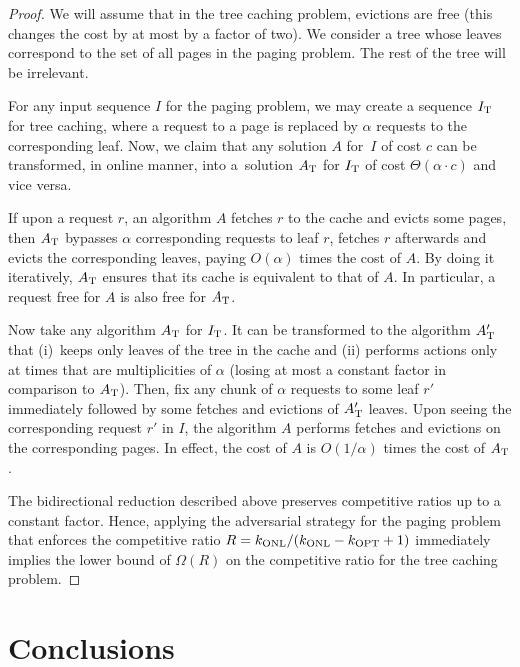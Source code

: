 \begin{proof}
We will assume that in the tree caching problem, evictions are free (this
changes the cost by at most by a factor of two). We consider a tree whose
leaves correspond to the set of all pages in the paging problem. The rest of
the tree will be irrelevant.

For any input sequence $I$ for the paging problem, we may create a sequence
$I_\textnormal{T}$ for tree caching, where a request to a page is replaced by
$\alpha$ requests to the corresponding leaf. Now, we claim that any solution
$A$ for~$I$ of cost $c$ can be transformed, in online manner, into a~solution
$A_\textnormal{T}$ for $I_\textnormal{T}$ of cost $\Theta(\alpha \cdot c)$ and
vice versa.

If upon a request $r$, an algorithm $A$ fetches $r$ to the cache and evicts
some pages, then $A_\textnormal{T}$ bypasses $\alpha$ corresponding requests
to leaf $r$, fetches $r$ afterwards and evicts the corresponding leaves,
paying $O(\alpha)$ times the cost of $A$. By doing it iteratively,
$A_\textnormal{T}$ ensures that its cache is equivalent to that of $A$. In
particular, a request free for $A$ is also free for $A_\textnormal{T}$.

Now take any algorithm $A_\textnormal{T}$ for $I_\textnormal{T}$. It can be
transformed to the algorithm $A_\textnormal{T}'$ that (i)~keeps only leaves of
the tree in the cache and (ii) performs actions only at times that are
multiplicities of $\alpha$ (losing at most a constant factor in comparison to
$A_\textnormal{T}$). Then, fix any chunk of $\alpha$ requests to some leaf
$r'$ immediately followed by some fetches and evictions of $A_\textnormal{T}'$
leaves. Upon seeing the corresponding request $r'$ in $I$, the algorithm $A$
performs fetches and evictions on the corresponding pages. In effect, the cost
of $A$ is $O(1/\alpha)$ times the cost of $A_\textnormal{T}$.

The bidirectional reduction described above preserves competitive ratios up to
a constant factor. Hence, applying the adversarial strategy for the paging
problem that enforces the competitive ratio  $R = k_\textnormal{ONL}/(k_\textnormal{ONL}-k_\textnormal{OPT}+1)$
\cite{competitive-analysis} immediately implies the lower bound of $\Omega(R)$
on the competitive ratio for the tree caching problem.
\end{proof}

\section{Conclusions}\label{sec:conclusion-caching}

